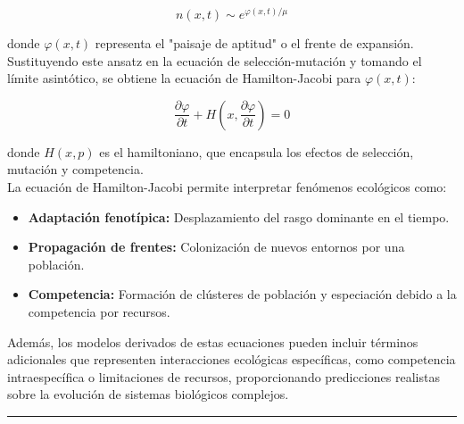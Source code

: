 \documentclass[letterpaper]{article}
\newcommand{\cbk}[1]{ \left( #1 \right) }
\newcommand{\Partial}[2]{ \frac{\partial#1}{\partial#2} }
\begin{document}
{            \[
                n(x, t) \sim e^{\varphi(x, t)/\mu}
            \]

            \normalsize{donde \( \varphi(x, t) \) representa el "paisaje de aptitud" o el frente de expansión. Sustituyendo este ansatz en la ecuación de selección-mutación y tomando el límite asintótico, se obtiene la ecuación de Hamilton-Jacobi para \( \varphi(x, t) \):}

            \[
                \Partial{\varphi}{t} + H\cbk{ x, \Partial{\varphi}{t} } = 0
            \]

            \normalsize{donde \( H(x, p) \) es el hamiltoniano, que encapsula los efectos de selección, mutación y competencia.}\\

            \normalsize{La ecuación de Hamilton-Jacobi permite interpretar fenómenos ecológicos como:}
            
            \begin{itemize}
                \item {
                
                    \normalsize{\textbf{Adaptación fenotípica:} Desplazamiento del rasgo dominante en el tiempo.}

                }
                \item {
                
                    \normalsize{\textbf{Propagación de frentes:} Colonización de nuevos entornos por una población.}

                }
                \item {
                
                    \normalsize{\textbf{Competencia:} Formación de clústeres de población y especiación debido a la competencia por recursos.}

                }
            \end{itemize}

            \normalsize{Además, los modelos derivados de estas ecuaciones pueden incluir términos adicionales que representen interacciones ecológicas específicas, como competencia intraespecífica o limitaciones de recursos, proporcionando predicciones realistas sobre la evolución de sistemas biológicos complejos.}
            
        }

    \vspace{0.2cm}
        \rule{150mm}{0.5mm} %
    \vspace{0.2cm}
\end{document}
